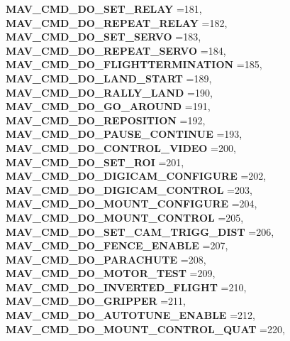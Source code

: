 \begin{DoxyCompactItemize}
\newline
\textbf{ M\+A\+V\+\_\+\+C\+M\+D\+\_\+\+D\+O\+\_\+\+S\+E\+T\+\_\+\+R\+E\+L\+AY} =181, 
\textbf{ M\+A\+V\+\_\+\+C\+M\+D\+\_\+\+D\+O\+\_\+\+R\+E\+P\+E\+A\+T\+\_\+\+R\+E\+L\+AY} =182, 
\textbf{ M\+A\+V\+\_\+\+C\+M\+D\+\_\+\+D\+O\+\_\+\+S\+E\+T\+\_\+\+S\+E\+R\+VO} =183, 
\textbf{ M\+A\+V\+\_\+\+C\+M\+D\+\_\+\+D\+O\+\_\+\+R\+E\+P\+E\+A\+T\+\_\+\+S\+E\+R\+VO} =184, 
\newline
\textbf{ M\+A\+V\+\_\+\+C\+M\+D\+\_\+\+D\+O\+\_\+\+F\+L\+I\+G\+H\+T\+T\+E\+R\+M\+I\+N\+A\+T\+I\+ON} =185, 
\textbf{ M\+A\+V\+\_\+\+C\+M\+D\+\_\+\+D\+O\+\_\+\+L\+A\+N\+D\+\_\+\+S\+T\+A\+RT} =189, 
\textbf{ M\+A\+V\+\_\+\+C\+M\+D\+\_\+\+D\+O\+\_\+\+R\+A\+L\+L\+Y\+\_\+\+L\+A\+ND} =190, 
\textbf{ M\+A\+V\+\_\+\+C\+M\+D\+\_\+\+D\+O\+\_\+\+G\+O\+\_\+\+A\+R\+O\+U\+ND} =191, 
\newline
\textbf{ M\+A\+V\+\_\+\+C\+M\+D\+\_\+\+D\+O\+\_\+\+R\+E\+P\+O\+S\+I\+T\+I\+ON} =192, 
\textbf{ M\+A\+V\+\_\+\+C\+M\+D\+\_\+\+D\+O\+\_\+\+P\+A\+U\+S\+E\+\_\+\+C\+O\+N\+T\+I\+N\+UE} =193, 
\textbf{ M\+A\+V\+\_\+\+C\+M\+D\+\_\+\+D\+O\+\_\+\+C\+O\+N\+T\+R\+O\+L\+\_\+\+V\+I\+D\+EO} =200, 
\textbf{ M\+A\+V\+\_\+\+C\+M\+D\+\_\+\+D\+O\+\_\+\+S\+E\+T\+\_\+\+R\+OI} =201, 
\newline
\textbf{ M\+A\+V\+\_\+\+C\+M\+D\+\_\+\+D\+O\+\_\+\+D\+I\+G\+I\+C\+A\+M\+\_\+\+C\+O\+N\+F\+I\+G\+U\+RE} =202, 
\textbf{ M\+A\+V\+\_\+\+C\+M\+D\+\_\+\+D\+O\+\_\+\+D\+I\+G\+I\+C\+A\+M\+\_\+\+C\+O\+N\+T\+R\+OL} =203, 
\textbf{ M\+A\+V\+\_\+\+C\+M\+D\+\_\+\+D\+O\+\_\+\+M\+O\+U\+N\+T\+\_\+\+C\+O\+N\+F\+I\+G\+U\+RE} =204, 
\textbf{ M\+A\+V\+\_\+\+C\+M\+D\+\_\+\+D\+O\+\_\+\+M\+O\+U\+N\+T\+\_\+\+C\+O\+N\+T\+R\+OL} =205, 
\newline
\textbf{ M\+A\+V\+\_\+\+C\+M\+D\+\_\+\+D\+O\+\_\+\+S\+E\+T\+\_\+\+C\+A\+M\+\_\+\+T\+R\+I\+G\+G\+\_\+\+D\+I\+ST} =206, 
\textbf{ M\+A\+V\+\_\+\+C\+M\+D\+\_\+\+D\+O\+\_\+\+F\+E\+N\+C\+E\+\_\+\+E\+N\+A\+B\+LE} =207, 
\textbf{ M\+A\+V\+\_\+\+C\+M\+D\+\_\+\+D\+O\+\_\+\+P\+A\+R\+A\+C\+H\+U\+TE} =208, 
\textbf{ M\+A\+V\+\_\+\+C\+M\+D\+\_\+\+D\+O\+\_\+\+M\+O\+T\+O\+R\+\_\+\+T\+E\+ST} =209, 
\newline
\textbf{ M\+A\+V\+\_\+\+C\+M\+D\+\_\+\+D\+O\+\_\+\+I\+N\+V\+E\+R\+T\+E\+D\+\_\+\+F\+L\+I\+G\+HT} =210, 
\textbf{ M\+A\+V\+\_\+\+C\+M\+D\+\_\+\+D\+O\+\_\+\+G\+R\+I\+P\+P\+ER} =211, 
\textbf{ M\+A\+V\+\_\+\+C\+M\+D\+\_\+\+D\+O\+\_\+\+A\+U\+T\+O\+T\+U\+N\+E\+\_\+\+E\+N\+A\+B\+LE} =212, 
\textbf{ M\+A\+V\+\_\+\+C\+M\+D\+\_\+\+D\+O\+\_\+\+M\+O\+U\+N\+T\+\_\+\+C\+O\+N\+T\+R\+O\+L\+\_\+\+Q\+U\+AT} =220, 
\newline

\end{DoxyCompactItemize}
